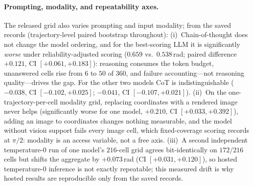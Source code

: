 \documentclass{article}
\begin{document}
\paragraph{Prompting, modality, and repeatability axes.}
\label{app:axes}
The released grid also varies prompting and input modality; from the saved records
(trajectory-level paired bootstrap throughout): (i)~Chain-of-thought does not change the
model ordering, and for the best-scoring LLM it is significantly \emph{worse} under
reliability-adjusted scoring ($0.659$ vs.\ $0.538$\,rad; paired difference $+0.121$, CI
$[+0.061,+0.183]$): reasoning consumes the token budget, unanswered cells rise from $6$ to
$50$ of $360$, and failure accounting---not reasoning quality---drives the gap. For the
other two models CoT is indistinguishable ($-0.038$, CI $[-0.102,+0.025]$; $-0.041$, CI
$[-0.107,+0.021]$). (ii)~On the one-trajectory-per-cell modality grid, replacing
coordinates with a rendered image never helps (significantly worse for one model, $+0.210$,
CI $[+0.033,+0.392]$), adding an image to coordinates changes nothing measurable, and the
model without vision support fails every image cell, which fixed-coverage scoring records
at $\pi/2$: modality is an access variable, not a free axis. (iii)~A second independent
temperature-$0$ run of one model's $216$-cell grid agrees bit-identically on $172/216$
cells but shifts the aggregate by $+0.073$\,rad (CI $[+0.031,+0.120]$), so hosted
temperature-$0$ inference is not exactly repeatable; this measured drift is why hosted
results are reproducible only from the saved records.
\end{document}
